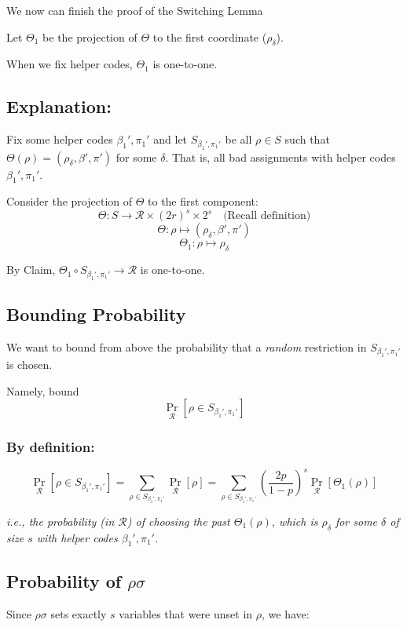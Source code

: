 We now can finish the proof of the Switching Lemma


Let \( \Theta_1 \) be the projection of \( \Theta \) to the first coordinate (\(\rho_{\delta}\)).

\begin{center}
   When we fix helper codes, \( \Theta_1 \) is one-to-one.
\end{center}

\subsection*{Explanation:}
Fix some helper codes \( \beta_1', \pi_1' \) and let \( S_{\beta_1', \pi_1'} \) be all \( \rho \in S \) such that \( \Theta(\rho) = (\rho_{\delta}, \beta', \pi') \) for some \( \delta \). That is, all bad assignments with helper codes \( \beta_1', \pi_1' \).

Consider the projection of \( \Theta \) to the first component:
\[
\Theta: S \to \mathcal{R} \times (2r)^s \times 2^s \quad \text{(Recall definition)}
\]
\[
\Theta: \rho \mapsto (\rho_{\delta}, \beta', \pi')
\]
\[
\Theta_1: \rho \mapsto \rho_{\delta}
\]

By Claim, \( \Theta_1 \circ S_{\beta_1',\pi_1'} \to \mathcal{R} \) is one-to-one.

\subsection*{Bounding Probability}
We want to bound from above the probability that a \textit{random} restriction in \( S_{\beta_1', \pi_1'} \) is chosen.

Namely, bound
\[
\Pr_{\mathcal{R}} [\rho \in S_{\beta_1', \pi_1'}]
\]

\subsubsection*{By definition:}
\[
\Pr_{\mathcal{R}} [\rho \in S_{\beta_1', \pi_1'}] = \sum_{\rho \in S_{\beta_1', \pi_1'}} \Pr_{\mathcal{R}} [\rho] = \sum_{\rho \in S_{\beta_1', \pi_1'}} \left( \frac{2p}{1-p} \right)^s \Pr_{\mathcal{R}} [\Theta_1(\rho)]
\]

\textit{i.e., the probability (in \( \mathcal{R} \)) of choosing the past \( \Theta_1(\rho) \), which is \( \rho_{\delta} \) for some \( \delta \) of size \( s \) with helper codes \( \beta_1', \pi_1' \).}

\subsection*{Probability of \( \rho\sigma \)}
Since \( \rho\sigma \) sets exactly \( s \) variables that were unset in \( \rho \), we have:

